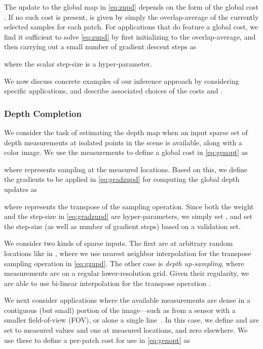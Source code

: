 \documentclass[10pt,twocolumn,letterpaper]{article}
\begin{document}
The update to the global map  in \eqref{eq:zupd} depends on the form of the global cost . If no such cost is present,  is given by simply the overlap-average of the currently selected samples  for each patch. For applications that do feature a global cost, we find it sufficient to solve \eqref{eq:zupd} by first initializing  to the overlap-average, and then carrying out a small number of gradient descent steps as

where the scalar step-size  is a hyper-parameter.

We now discuss concrete examples of our inference approach by considering specific applications, and describe associated choices of the costs  and .

\subsubsection{Depth Completion}
 We consider the task of estimating the depth map  when an input sparse set  of depth measurements  at isolated points in the scene is available, along with a color image. We use the measurements  to define a global cost  in \eqref{eq:genopt} as

where  represents sampling  at the measured locations. Based on this, we define the gradients to be applied in \eqref{eq:gradzupd} for computing the global depth updates as

where  represents the transpose of the sampling operation. Since both the weight  and the step-size  in \eqref{eq:gradzupd} are hyper-parameters, we simply set , and set the step-size  (as well as number of gradient steps) based on a validation set.

We consider two kinds of sparse inputs. The first are at arbitrary random locations like in \cite{van2019sparse,ma2018sparse,jaritz2018sparse,wang2019plug,shivakumar2019dfusenet}, where we use nearest neighbor interpolation for the transpose sampling operation   in \eqref{eq:gzupd}. The other case is \emph{depth up-sampling}, where measurements are on a regular lower-resolution grid. Given their regularity, we are able to use bi-linear interpolation for the transpose operation . 


 We next consider applications where the available measurements are dense in a contiguous (but small) portion of the image---such as from a sensor with a smaller field-of-view (FOV), or alone a single line~\cite{liao2017sparse}. In this case, we define  and  are set to measured values and one at measured locations, and zero elsewhere. We use these to define a per-patch cost  for use in \eqref{eq:genopt} as
\end{document}
